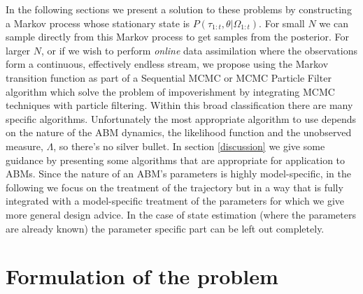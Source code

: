 \documentclass{article}
\begin{document}
In the following sections we present a solution to these problems by constructing a Markov process whose stationary state is $P(\tau_{1:t},\theta|\Omega_{1:t})$. For small $N$ we can sample directly from this Markov process to get samples from the posterior. For larger $N$, or if we wish to perform \textit{online} data assimilation where the observations form a continuous, effectively endless stream, we propose using the Markov transition function as part of a Sequential MCMC or MCMC Particle Filter algorithm \citep*{finke2020limit, septier2009mcmc} which solve the problem of impoverishment by integrating MCMC techniques with particle filtering. Within this broad classification there are many specific algorithms. Unfortunately the most appropriate algorithm to use depends on the nature of the ABM dynamics, the likelihood function and the unobserved measure, $\Lambda$, so there's no silver bullet. In section \ref{discussion} we give some guidance by presenting some algorithms that are appropriate for application to ABMs. Since the nature of an ABM's parameters is highly model-specific, in the following we focus on the treatment of the trajectory but in a way that is fully integrated with a model-specific treatment of the parameters for which we give more general design advice. In the case of state estimation (where the parameters are already known) the parameter specific part can be left out completely.

\section{Formulation of the problem}
\end{document}
